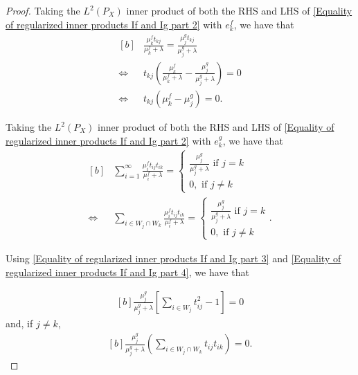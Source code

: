\documentclass[11pt]{article}
\newcommand{\LPtwo}{L^{2}(P_{X})}
\theoremstyle{plain}
\begin{document}
\begin{proof}
    Taking the $\LPtwo$ inner product of both the RHS and LHS of \eqref{Equality of regularized inner products If and Ig part 2} with $e_{k}^{f}$, we have that
    \begin{equation}\label{Equality of regularized inner products If and Ig part 3}
        \begin{aligned}[b]
            &\frac{\mu_{k}^{f}t_{kj}}{\mu_{k}^{f} + \lambda} = \frac{\mu_{j}^{g}t_{kj}}{\mu_{j}^{g} + \lambda} \\
            \iff & t_{kj} \left(\frac{\mu_{k}^{f}}{\mu_{k}^{f} + \lambda} - \frac{\mu_{j}^{g}}{\mu_{j}^{g} + \lambda}  \right) = 0\\
            \iff & t_{kj} \left( \mu_{k}^{f} - \mu_{j}^{g}\right) = 0 .
        \end{aligned}
    \end{equation}

    Taking the $\LPtwo$ inner product of both the RHS and LHS of \eqref{Equality of regularized inner products If and Ig part 2} with $e_{k}^{g}$, we have that
    \begin{equation}\label{Equality of regularized inner products If and Ig part 4}
        \begin{aligned}[b]
        & \sum_{i=1}^{\infty} \frac{\mu_{i}^{f}t_{ij}t_{ik}}{\mu_{i}^{f} + \lambda} = \begin{cases}
            \frac{\mu_{j}^{g}}{\mu_{j}^{g} + \lambda} \textrm{ if } j = k \\
            0, \textrm{ if } j \neq k
        \end{cases} \\
        \iff & \sum_{i \in W_{j} \cap W_{k}}\frac{\mu_{i}^{f}t_{ij}t_{ik}}{\mu_{i}^{f} + \lambda} = \begin{cases}
            \frac{\mu_{j}^{g}}{\mu_{j}^{g} + \lambda} \textrm{ if } j = k \\
            0, \textrm{ if } j \neq k
        \end{cases}.
        \end{aligned}
    \end{equation}

    Using \eqref{Equality of regularized inner products If and Ig part 3} and \eqref{Equality of regularized inner products If and Ig part 4}, we have that

    \begin{equation}\label{Equality of regularized inner products If and Ig part 5}
        \begin{aligned}[b]
        \frac{\mu_{j}^{g}}{\mu_{j}^{g} + \lambda} \left[ \sum_{i \in W_{j}}t_{ij}^{2} - 1\right] = 0
        \end{aligned}
    \end{equation}
    and, if $j \neq k$,
    \begin{equation}\label{Equality of regularized inner products If and Ig part 6}
        \begin{aligned}[b]
        \frac{\mu_{j}^{g}}{\mu_{j}^{g} + \lambda} \left( \sum_{i \in W_{j}\cap W_{k}}t_{ij}t_{ik}\right) = 0.
        \end{aligned}
    \end{equation}


\end{proof}
\end{document}

